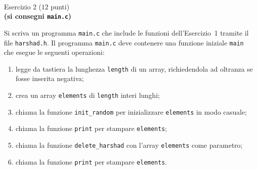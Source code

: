 \documentclass[12pt]{article}
\begin{document}
\mbox{}\\
\begin{center}{\Large Esercizio 2} ($12$ punti)\\
  \textbf{(si consegni \texttt{main.c})}\end{center}
%
Si scriva un programma \texttt{main.c} che include le funzioni dell'Esercizio~1 tramite
il file \texttt{harshad.h}.
Il programma \texttt{main.c} deve contenere una funzione iniziale \texttt{main} che esegue
le seguenti operazioni:
\begin{enumerate}
\item legge da tastiera la lunghezza \texttt{length} di un array, richiedendola ad oltranza se fosse inserita negativa;
\item crea un array \texttt{elements} di \texttt{length} interi lunghi;
\item chiama la funzione \texttt{init\_random} per inizializzare \texttt{elements} in modo casuale;
\item chiama la funzione \texttt{print} per stampare \texttt{elements};
\item chiama la funzione \texttt{delete\_harshad} con l'array \texttt{elements} come parametro;
\item chiama la funzione \texttt{print} per stampare \texttt{elements}.
\end{enumerate}
\end{document}

